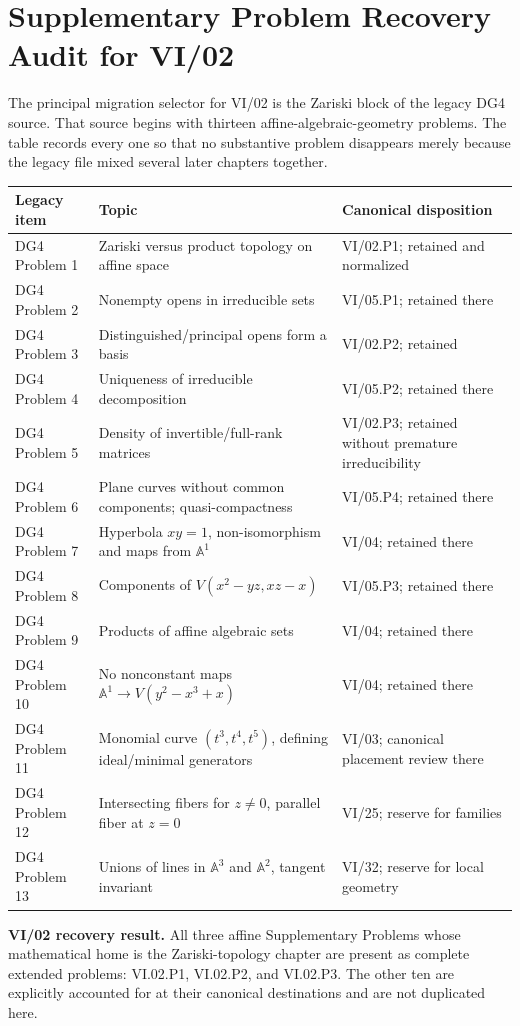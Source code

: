 \chapter*{Supplementary Problem Recovery Audit for VI/02}

The principal migration selector for VI/02 is the Zariski block of the legacy DG4 source.
That source begins with thirteen affine-algebraic-geometry problems.  The table records every
one so that no substantive problem disappears merely because the legacy file mixed several
later chapters together.

\begin{longtable}{p{}p{}p{}}
\toprule
\textbf{Legacy item} & \textbf{Topic} & \textbf{Canonical disposition}\\
\midrule
DG4 Problem 1 & Zariski versus product topology on affine space & VI/02.P1; retained and normalized\\
DG4 Problem 2 & Nonempty opens in irreducible sets & VI/05.P1; retained there\\
DG4 Problem 3 & Distinguished/principal opens form a basis & VI/02.P2; retained\\
DG4 Problem 4 & Uniqueness of irreducible decomposition & VI/05.P2; retained there\\
DG4 Problem 5 & Density of invertible/full-rank matrices & VI/02.P3; retained without premature irreducibility\\
DG4 Problem 6 & Plane curves without common components; quasi-compactness & VI/05.P4; retained there\\
DG4 Problem 7 & Hyperbola \(xy=1\), non-isomorphism and maps from \(\mathbb A^1\) & VI/04; retained there\\
DG4 Problem 8 & Components of \(V(x^2-yz,xz-x)\) & VI/05.P3; retained there\\
DG4 Problem 9 & Products of affine algebraic sets & VI/04; retained there\\
DG4 Problem 10 & No nonconstant maps \(\mathbb A^1\to V(y^2-x^3+x)\) & VI/04; retained there\\
DG4 Problem 11 & Monomial curve \((t^3,t^4,t^5)\), defining ideal/minimal generators & VI/03; canonical placement review there\\
DG4 Problem 12 & Intersecting fibers for \(z\neq0\), parallel fiber at \(z=0\) & VI/25; reserve for families\\
DG4 Problem 13 & Unions of lines in \(\mathbb A^3\) and \(\mathbb A^2\), tangent invariant & VI/32; reserve for local geometry\\
\bottomrule
\end{longtable}

\bigskip
\noindent
\textbf{VI/02 recovery result.}
All three affine Supplementary Problems whose mathematical home is the Zariski-topology chapter are
present as complete extended problems: VI.02.P1, VI.02.P2, and VI.02.P3.  The other ten are explicitly
accounted for at their canonical destinations and are not duplicated here.

